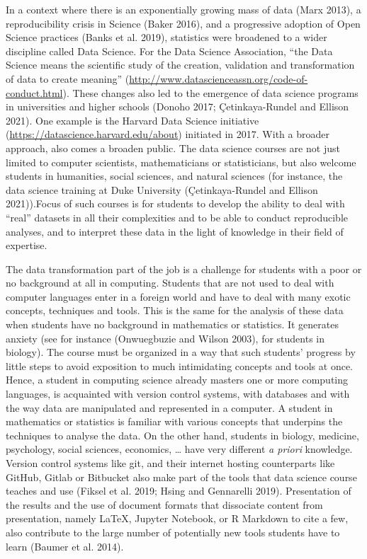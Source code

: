 \documentclass[
]{article}
\begin{document}
In a context where there is an exponentially growing mass of data (Marx
2013), a reproducibility crisis in Science (Baker 2016), and a
progressive adoption of Open Science practices (Banks et al. 2019),
statistics were broadened to a wider discipline called Data Science. For
the Data Science Association, ``the Data Science means the scientific
study of the creation, validation and transformation of data to create
meaning'' (\url{http://www.datascienceassn.org/code-of-conduct.html}).
These changes also led to the emergence of data science programs in
universities and higher schools (Donoho 2017; Çetinkaya-Rundel and
Ellison 2021). One example is the Harvard Data Science initiative
(\url{https://datascience.harvard.edu/about}) initiated in 2017. With a
broader approach, also comes a broaden public. The data science courses
are not just limited to computer scientists, mathematicians or
statisticians, but also welcome students in humanities, social sciences,
and natural sciences (for instance, the data science training at Duke
University (Çetinkaya-Rundel and Ellison 2021)).Focus of such courses is
for students to develop the ability to deal with ``real'' datasets in
all their complexities and to be able to conduct reproducible analyses,
and to interpret these data in the light of knowledge in their field of
expertise.

The data transformation part of the job is a challenge for students with
a poor or no background at all in computing. Students that are not used
to deal with computer languages enter in a foreign world and have to
deal with many exotic concepts, techniques and tools. This is the same
for the analysis of these data when students have no background in
mathematics or statistics. It generates anxiety (see for instance
(Onwuegbuzie and Wilson 2003), for students in biology). The course must
be organized in a way that such students' progress by little steps to
avoid exposition to much intimidating concepts and tools at once. Hence,
a student in computing science already masters one or more computing
languages, is acquainted with version control systems, with databases
and with the way data are manipulated and represented in a computer. A
student in mathematics or statistics is familiar with various concepts
that underpins the techniques to analyse the data. On the other hand,
students in biology, medicine, psychology, social sciences, economics,
\ldots{} have very different \emph{a priori} knowledge. Version control
systems like git, and their internet hosting counterparts like GitHub,
Gitlab or Bitbucket also make part of the tools that data science course
teaches and use (Fiksel et al. 2019; Hsing and Gennarelli 2019).
Presentation of the results and the use of document formats that
dissociate content from presentation, namely LaTeX, Jupyter Notebook, or
R Markdown to cite a few, also contribute to the large number of
potentially new tools students have to learn (Baumer et al. 2014).
\end{document}
